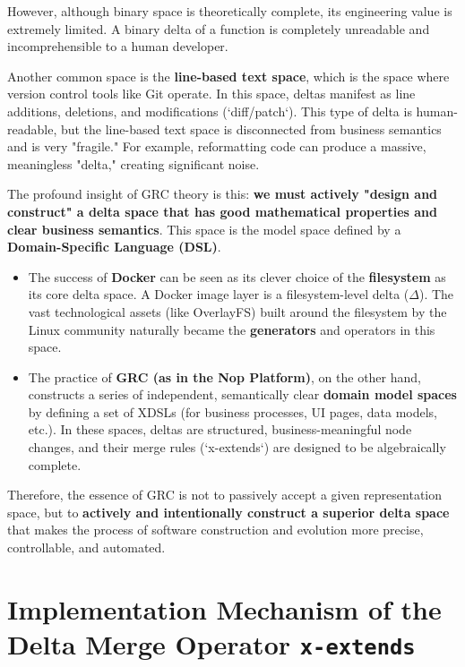 \documentclass[11pt]{article}
\begin{document}
However, although binary space is theoretically complete, its engineering value is extremely limited. A binary delta of a function is completely unreadable and incomprehensible to a human developer.

Another common space is the \textbf{line-based text space}, which is the space where version control tools like Git operate. In this space, deltas manifest as line additions, deletions, and modifications (`diff/patch`). This type of delta is human-readable, but the line-based text space is disconnected from business semantics and is very "fragile." For example, reformatting code can produce a massive, meaningless "delta," creating significant noise.

The profound insight of GRC theory is this: \textbf{we must actively "design and construct" a delta space that has good mathematical properties and clear business semantics}. This space is the model space defined by a \textbf{Domain-Specific Language (DSL)}.

\begin{itemize}
    \item The success of \textbf{Docker} can be seen as its clever choice of the \textbf{filesystem} as its core delta space. A Docker image layer is a filesystem-level delta ($\Delta$). The vast technological assets (like OverlayFS) built around the filesystem by the Linux community naturally became the \textbf{generators} and operators in this space.
    \item The practice of \textbf{GRC (as in the Nop Platform)}, on the other hand, constructs a series of independent, semantically clear \textbf{domain model spaces} by defining a set of XDSLs (for business processes, UI pages, data models, etc.). In these spaces, deltas are structured, business-meaningful node changes, and their merge rules (`x-extends`) are designed to be algebraically complete.
\end{itemize}

Therefore, the essence of GRC is not to passively accept a given representation space, but to \textbf{actively and intentionally construct a superior delta space} that makes the process of software construction and evolution more precise, controllable, and automated.

\section{Implementation Mechanism of the Delta Merge Operator \texttt{x-extends}}
\end{document}
